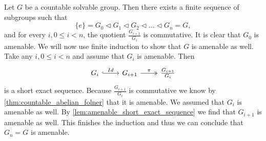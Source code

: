 Let $G$ be a countable solvable group. Then there exists a finite sequence of subgroups such that 
$$\{e\} = G_0 \triangleleft G_1 \triangleleft G_2 \triangleleft \dots \triangleleft G_n = G,$$ and for every $i, 0\le i<n$, the quotient $\frac{G_{i+1}}{G_i}$ is commutative. 
It is clear that $G_0$ is amenable. We will now use finite induction to show that $G$ is amenable as well. 
Take any $i, 0\le i<n$ and assume that $G_i$ is amenable. Then 
\[\begin{tikzcd}
    G_i \arrow[r, "Id", hook] & G_{i+1} \arrow[r, "\pi", two heads] & \frac{G_{i+1}}{G_i}
    \end{tikzcd}\]
is a short exact sequence. Because $\frac{G_{i+1}}{G_i}$ is commutative we know by \cref{thm:countable_abelian_folner} that it is amenable. We assumed that $G_i$ is amenable as well. By \cref{lem:amenable_short_exact_sequence} we find that $G_{i+1}$ is amenable as well. This finishes the induction and thus we can conclude that $G_n = G$ is amenable.
